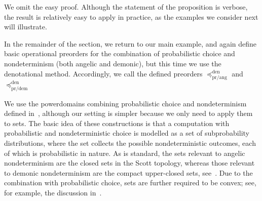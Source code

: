 \documentclass[a4paper,UKenglish]{lipics-v2018}
\newcommand{\Basicleq}{\preccurlyeq}
\newcommand{\prang}{\text{pr/ang}}
\newcommand{\prdem}{\text{pr/dem}}
\newcommand{\Den}{\text{den}}
\newcommand{\Set}{\mathbf{Set}}
\newcommand{\ContAlg}{\mathbf{ContAlg}}
\newcommand{\wCPO}{\mathbf{{\omega}CPO}}
\theoremstyle{plain}
\begin{document}


\noindent
We omit the easy proof. 
Although the statement of the proposition is verbose, the result is relatively easy to apply in practice, as the examples we consider next will illustrate.

%
%

In the remainder of the section, we return to our main example, and again define basic operational preorders for the combination of probabilistic choice and nondeterminism (both angelic and demonic), but this time we use the denotational method. Accordingly, we call the defined preorders
$\Basicleq^\Den_\prang$ and $\Basicleq^\Den_\prdem$

We use the powerdomains combining probabilistic choice and nondeterminism
defined in~\cite[\S3.4]{KeimelP2016}, although our setting is simpler because we only need to apply them to sets.
The basic idea of these constructions is that a computation with probabilistic and nondeterministic choice is modelled as a set of subprobability distributions, where the set collects the possible nondeterministic outcomes, each of which is probabilistic in nature. As is standard, 
the sets relevant to angelic nondeterminism are the closed sets in the Scott topology, whereas those relevant to demonic nondeterminism are the compact upper-closed sets, see~\cite{smyth}.
Due to the combination with probabilistic choice,  sets are further required to be convex; see, for example, the discussion in~\cite{KeimelP2016}.
\end{document}
